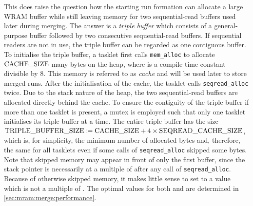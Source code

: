 This does raise the question how the starting run formation can allocate a large WRAM buffer while still leaving memory for two sequential-read buffers used later during merging.
The answer is a \emph{triple buffer} which consists of a general-purpose buffer followed by two consecutive sequential-read buffers.
If sequential readers are not in use, the triple buffer can be regarded as one contiguous buffer.
To initialise the triple buffer, a tasklet first calls \lstinline|mem_alloc| to allocate \(\cachesize{}\) many bytes on the heap, where \cachesize{} is a compile-time constant divisible by 8.
This memory is referred to as \emph{cache} and will be used later to store merged runs.
After the initialisation of the cache, the tasklet calls \lstinline|seqread_alloc| twice.
Due to the stack nature of the heap, the two sequential-read buffers are allocated directly behind the cache.
To ensure the contiguity of the triple buffer if more than one tasklet is present, a mutex is employed such that only one tasklet initialises its triple buffer at a time.
The entire triple buffer has the size \(\triplebuffersize \coloneqq \cachesize{} + 4 \times \seqreadcachesize{}\), which is, for simplicity, the minimum number of allocated bytes and, therefore, the same for all tasklets even if some calls of \lstinline|seqread_alloc| skipped some bytes.
Note that skipped memory may appear in front of only the first buffer, since the stack pointer is necessarily at a multiple of \seqreadcachesize{} after any call of \lstinline|seqread_alloc|.
Because of otherwise skipped memory, it makes little sense to set \cachesize{} to a value which is not a multiple of \seqreadcachesize{}.
The optimal values for both \cachesize{} and \seqreadcachesize{} are determined in \cref{sec:mram:merge:performance}.


